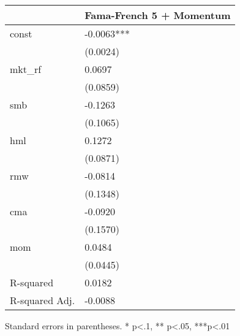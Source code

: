 \begin{table}
\caption{}
\label{}
\begin{center}
\begin{tabular}{ll}
\hline
               & Fama-French 5 + Momentum  \\
\hline
const          & -0.0063***                \\
               & (0.0024)                  \\
mkt\_rf        & 0.0697                    \\
               & (0.0859)                  \\
smb            & -0.1263                   \\
               & (0.1065)                  \\
hml            & 0.1272                    \\
               & (0.0871)                  \\
rmw            & -0.0814                   \\
               & (0.1348)                  \\
cma            & -0.0920                   \\
               & (0.1570)                  \\
mom            & 0.0484                    \\
               & (0.0445)                  \\
R-squared      & 0.0182                    \\
R-squared Adj. & -0.0088                   \\
\hline
\end{tabular}
\end{center}
\end{table}
\bigskip
Standard errors in parentheses. \newline 
* p<.1, ** p<.05, ***p<.01